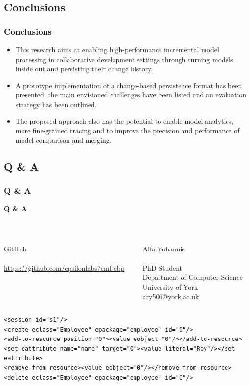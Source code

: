 \documentclass{beamer}
\begin{document}
\begin{frame}
\section{Conclusions}
\frametitle{Conclusions}
\begin{itemize}
\item This research aims at enabling high-performance incremental model processing in collaborative development settings through turning models inside out and persisting their change history.
\item A prototype implementation of a change-based persistence format has been presented, the main envisioned challenges have been listed and an evaluation strategy has been outlined.
\item The proposed approach also has the potential to enable model analytics, more fine-grained tracing and to improve the precision and performance of model comparison and merging. 
\end{itemize}
\end{frame}

\begin{frame}[fragile]
\section{Q \& A}
\frametitle{Q \& A}
\begin{center}
\textbf{\LARGE Q \& A}\\
\end{center}
\hfill\\
\begin{columns}
\begin{column}{0.5\textwidth}
\begin{center}
GitHub\\
\hfill\\
\url{https://github.com/epsilonlabs/emf-cbp}
\end{center}
\end{column}
\begin{column}{0.5\textwidth}
\begin{center}
Alfa Yohannis\\
{\scriptsize
    \hfill\\
    PhD Student\\
    Department of Computer Science\\
    University of York\\
    ary506@york.ac.uk\\
}
\end{center}
\end{column}
\end{columns}

\begin{lstlisting}[style=xml,label=lst:cbpmodel2]
<session id="s1"/>
<create eclass="Employee" epackage="employee" id="0"/>
<add-to-resource position="0"><value eobject="0"/></add-to-resource>
<set-eattribute name="name" target="0"><value literal="Roy"/></set-eattribute>
<remove-from-resource><value eobject="0"/></remove-from-resource>
<delete eclass="Employee" epackage="employee" id="0"/>
\end{lstlisting}

\end{frame}
\end{document}
